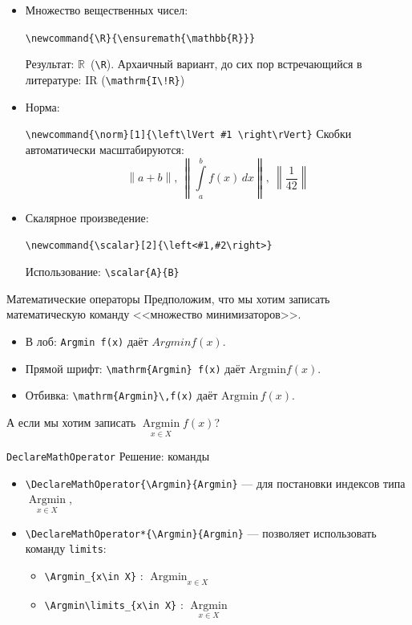 \documentclass[ mathserif]{beamer}
\newcommand{\R}{\ensuremath{\mathbb{R}}}
\newcommand{\scalar}[2]{\left<#1,#2\right>}          %
\newcommand{\norm}[1]{\left\lVert #1 \right\rVert}   %
\DeclareMathOperator{\ArgminA}{Argmin}
\DeclareMathOperator*{\ArgminB}{Argmin}
\begin{document}
%
%
%
\begin{frame}[fragile]
\begin{itemize}
\item Множество вещественных чисел:

\verb:\newcommand{\R}{\ensuremath{\mathbb{R}}}:

Результат: \R\  (\verb:\R:). Архаичный вариант, до сих пор встречающийся в литературе: $\mathrm{I\!R}$ (\verb:\mathrm{I\!R}:)
\item Норма:

\verb:\newcommand{\norm}[1]{\left\lVert #1 \right\rVert}: Скобки автоматически масштабируются:
$$
\norm{a + b},\ \norm{\int\limits_a^b f(x)\,dx},\ \norm{\dfrac{1}{42}}
$$
\item Скалярное произведение:

\verb:\newcommand{\scalar}[2]{\left<#1,#2\right>}:
 
Использование: \verb:\scalar{A}{B}:
\end{itemize}
\end{frame}
%
%
%
\begin{frame}[fragile]{Математические операторы}
Предположим, что мы хотим записать математическую команду <<множество минимизаторов>>. 
\begin{itemize}
\item В лоб: \verb:Argmin f(x): даёт $Argmin f(x)$.

\item Прямой шрифт: \verb:\mathrm{Argmin} f(x): даёт $\mathrm{Argmin} f(x)$.

\item Отбивка: \verb:\mathrm{Argmin}\,f(x): даёт $\mathrm{Argmin}\,f(x)$.

\end{itemize}
А если мы хотим записать $\ArgminB\limits_{x\in X}f(x)$?

\end{frame}
%
%
%
\begin{frame}[fragile]{\texttt{DeclareMathOperator}}
Решение: команды 
\begin{itemize}
\item \verb:\DeclareMathOperator{\Argmin}{Argmin}: --- для постановки индексов типа $\ArgminA\limits_{x\in X}$,

\item \verb:\DeclareMathOperator*{\Argmin}{Argmin}: --- позволяет использовать команду \verb:limits::
\begin{itemize}
\item \verb:\Argmin_{x\in X}: : $\ArgminB_{x\in X}$

\item \verb:\Argmin\limits_{x\in X}: : $\ArgminB\limits_{x\in X}$
\end{itemize}
\end{itemize}
\end{frame}
\end{document}
